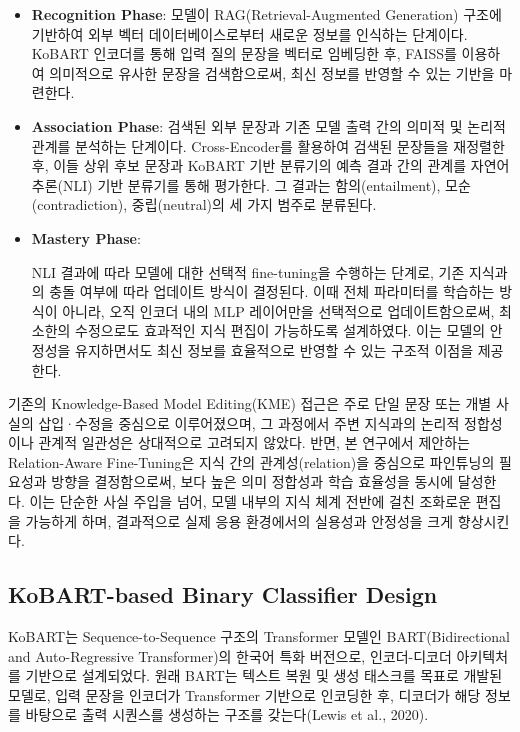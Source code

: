 \documentclass[a4paper,fleqn]{cas-sc}
\begin{document}
\begin{itemize}
    \item{\textbf{Recognition Phase}:
    모델이 RAG(Retrieval-Augmented Generation) 구조에 기반하여 외부 벡터 데이터베이스로부터 새로운 정보를 인식하는 단계이다. KoBART 인코더를 통해 입력 질의 문장을 벡터로 임베딩한 후, FAISS를 이용하여 의미적으로 유사한 문장을 검색함으로써, 최신 정보를 반영할 수 있는 기반을 마련한다.}
    
    \item{\textbf{Association Phase}:
    검색된 외부 문장과 기존 모델 출력 간의 의미적 및 논리적 관계를 분석하는 단계이다. Cross-Encoder를 활용하여 검색된 문장들을 재정렬한 후, 이들 상위 후보 문장과 KoBART 기반 분류기의 예측 결과 간의 관계를 자연어 추론(NLI) 기반 분류기를 통해 평가한다. 그 결과는 함의(entailment), 모순(contradiction), 중립(neutral)의 세 가지 범주로 분류된다.}
    
    \item{\textbf{Mastery Phase}:
    
    NLI 결과에 따라 모델에 대한 선택적 fine-tuning을 수행하는 단계로, 기존 지식과의 충돌 여부에 따라 업데이트 방식이 결정된다. 이때 전체 파라미터를 학습하는 방식이 아니라, 오직 인코더 내의 MLP 레이어만을 선택적으로 업데이트함으로써, 최소한의 수정으로도 효과적인 지식 편집이 가능하도록 설계하였다. 이는 모델의 안정성을 유지하면서도 최신 정보를 효율적으로 반영할 수 있는 구조적 이점을 제공한다.
    }

\end{itemize}  

기존의 Knowledge-Based Model Editing(KME) 접근은 주로 단일 문장 또는 개별 사실의 삽입·수정을 중심으로 이루어졌으며, 그 과정에서 주변 지식과의 논리적 정합성이나 관계적 일관성은 상대적으로 고려되지 않았다. 반면, 본 연구에서 제안하는 Relation-Aware Fine-Tuning은 지식 간의 관계성(relation)을 중심으로 파인튜닝의 필요성과 방향을 결정함으로써, 보다 높은 의미 정합성과 학습 효율성을 동시에 달성한다. 이는 단순한 사실 주입을 넘어, 모델 내부의 지식 체계 전반에 걸친 조화로운 편집을 가능하게 하며, 결과적으로 실제 응용 환경에서의 실용성과 안정성을 크게 향상시킨다.




\subsection{KoBART-based Binary Classifier Design}

KoBART는 Sequence-to-Sequence 구조의 Transformer 모델인 BART(Bidirectional and Auto-Regressive Transformer)의 한국어 특화 버전으로, 인코더-디코더 아키텍처를 기반으로 설계되었다. 원래 BART는 텍스트 복원 및 생성 태스크를 목표로 개발된 모델로, 입력 문장을 인코더가 Transformer 기반으로 인코딩한 후, 디코더가 해당 정보를 바탕으로 출력 시퀀스를 생성하는 구조를 갖는다(Lewis et al., 2020).
\end{document}
